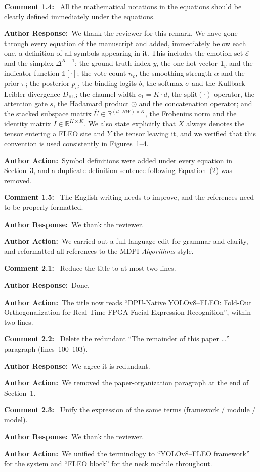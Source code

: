 \documentclass[11pt]{article}
\newcommand{\comment}[1]{\smallskip\noindent\textbf{\color{navy}Comment #1:}\ }
\newcommand{\response}{\smallskip\par\noindent\textbf{\color{steel}Author Response:}\ }
\newcommand{\action}{\smallskip\par\noindent\textbf{\color{steel}Author Action:}\ }
\newcommand{\rev}[1]{\medskip\par\noindent{\large\bfseries\color{navy}#1}\par\smallskip}
\begin{document}
\comment{1.4} All the mathematical notations in the equations should be clearly defined
immediately under the equations.

\response We thank the reviewer for this remark. We have gone through every equation of the
manuscript and added, immediately below each one, a definition of all symbols appearing in
it. This includes the emotion set $\mathcal{E}$ and the simplex $\Delta^{K-1}$; the
ground-truth index $y$, the one-hot vector $\mathbf{1}_y$ and the indicator function
$\mathbb{1}[\cdot]$; the vote count $n_c$, the smoothing strength $\alpha$ and the prior
$\pi$; the posterior $p_c$, the binding logits $b$, the softmax $\sigma$ and the
Kullback--Leibler divergence $D_{\mathrm{KL}}$; the channel width $c_1=K\cdot d$, the
$\mathrm{split}(\cdot)$ operator, the attention gate $s$, the Hadamard product $\odot$ and
the concatenation operator; and the stacked subspace matrix
$\hat{U}\in\mathbb{R}^{(d\cdot HW)\times K}$, the Frobenius norm and the identity matrix
$I\in\mathbb{R}^{K\times K}$. We also state explicitly that $X$ always denotes the tensor
entering a FLEO site and $Y$ the tensor leaving it, and we verified that this convention is
used consistently in Figures~1--4.

\action Symbol definitions were added under every equation in Section~3, and a duplicate
definition sentence following Equation~(2) was removed.

\comment{1.5} The English writing needs to improve, and the references need to be properly
formatted.

\response We thank the reviewer.

\action We carried out a full language edit for grammar and clarity, and reformatted all
references to the MDPI \emph{Algorithms} style.

\rev{Reviewer 2}

\comment{2.1} Reduce the title to at most two lines.
\response Done.
\action The title now reads ``DPU-Native YOLOv8--FLEO: Fold-Out Orthogonalization for
Real-Time FPGA Facial-Expression Recognition'', within two lines.

\comment{2.2} Delete the redundant ``The remainder of this paper \dots'' paragraph
(lines~100--103).
\response We agree it is redundant.
\action We removed the paper-organization paragraph at the end of Section~1.

\comment{2.3} Unify the expression of the same terms (framework / module / model).
\response We thank the reviewer.
\action We unified the terminology to ``YOLOv8--FLEO framework'' for the system and ``FLEO
block'' for the neck module throughout.
\end{document}

